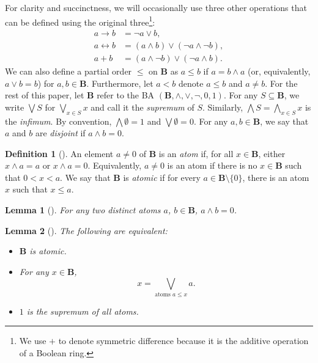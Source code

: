 \documentclass{article}
\newtheorem{lemma}{Lemma}
\theoremstyle{definition}
\newtheorem{definition}{Definition}
\theoremstyle{remark}
\begin{document}
For clarity and succinctness, we will occasionally use three other operations
that can be defined using the original three\footnote{We use $+$ to denote
  symmetric difference because it is the additive operation of a Boolean ring.}:
\begin{align*}
  a \to b &= \neg a \lor b, \\
  a \leftrightarrow b &= (a \land b) \lor (\neg a \land \neg b), \\
  a + b &= (a \land \neg b) \lor (\neg a \land b).
\end{align*}
We can also define a partial order $\le$ on $\mathbf{B}$ as $a \le b$ if $a = b
\land a$ (or, equivalently, $a \lor b = b$) for $a, b \in \mathbf{B}$.
Furthermore, let $a < b$ denote $a \le b$ and $a \ne b$. For the rest of this
paper, let $\mathbf{B}$ refer to the BA $(\mathbf{B}, \land, \lor, \neg, 0, 1)$.
For any $S \subseteq \mathbf{B}$, we write $\bigvee S$ for $\bigvee_{x \in S} x$
and call it the \emph{supremum} of $S$. Similarly, $\bigwedge S = \bigwedge_{x
  \in S} x$ is the \emph{infimum}. By convention, $\bigwedge \emptyset = 1$ and
$\bigvee \emptyset = 0$. For any $a, b \in \mathbf{B}$, we say that $a$ and $b$
are \emph{disjoint} if $a \land b = 0$.

\begin{definition}[\cite{DBLP:books/daglib/0090259,levasseur2012applied}]
  An element $a \ne 0$ of $\mathbf{B}$ is an \emph{atom} if, for all $x \in
  \mathbf{B}$, either $x \land a = a$ or $x \land a = 0$. Equivalently, $a \ne
  0$ is an atom if there is no $x \in \mathbf{B}$ such that $0 < x < a$. We say
  that $\mathbf{B}$ is \emph{atomic} if for every $a \in \mathbf{B} \setminus \{0
  \}$, there is an atom $x$ such that $x \le a$.
\end{definition}

\begin{lemma}[\cite{ganesh2006introduction}]
  For any two distinct atoms $a$, $b \in \mathbf{B}$, $a \land b = 0$.
\end{lemma}

\begin{lemma}[\cite{givant2008introduction}] \label{thm:representation}
  The following are equivalent:
  \begin{itemize}
  \item $\mathbf{B}$ is atomic.
  \item For any $x \in \mathbf{B}$,
    \[
      x = \bigvee_{\text{atoms } a \le x} a.
    \]
  \item $1$ is the supremum of all atoms.
  \end{itemize}
\end{lemma}
\end{document}

